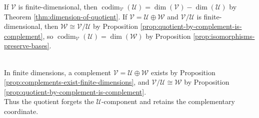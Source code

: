 If $\mathcal{V}$ is finite-dimensional, then $\operatorname{codim}_{\mathcal{V}}(\mathcal{U})=\dim(\mathcal{V})-\dim(\mathcal{U})$ by Theorem \ref{thm:dimension-of-quotient}. If $\mathcal{V}=\mathcal{U}\oplus\mathcal{W}$ and $\mathcal{V}/\mathcal{U}$ is finite-dimensional, then $\mathcal{W}\cong\mathcal{V}/\mathcal{U}$ by Proposition \ref{prop:quotient-by-complement-is-complement}, so $\operatorname{codim}_{\mathcal{V}}(\mathcal{U})=\dim(\mathcal{W})$ by Proposition \ref{prop:isomorphisms-preserve-bases}.

\begin{perspective} \label{per:quotients-split-over-fields} \\
In finite dimensions, a complement $\mathcal{V}=\mathcal{U}\oplus\mathcal{W}$ exists by Proposition \ref{prop:complements-exist-finite-dimensions}, and $\mathcal{V}/\mathcal{U}\cong\mathcal{W}$ by Proposition \ref{prop:quotient-by-complement-is-complement}.\\
Thus the quotient forgets the $\mathcal{U}$-component and retains the complementary coordinate.
\end{perspective}

